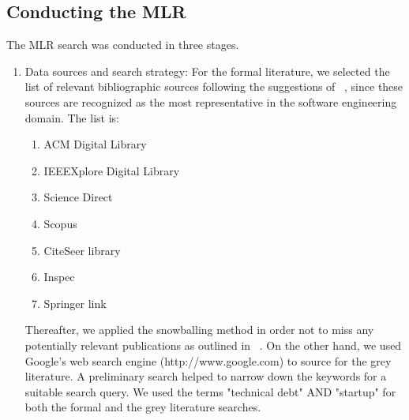 \documentclass[manuscript]{acmart}
\begin{document}
\subsection{Conducting the MLR}
The MLR search was conducted in three stages.
\begin{enumerate}
\item Data sources and search strategy: For the formal literature, we selected the list of relevant bibliographic sources following the suggestions of ~\cite{kitchenham2007guidelines}, since these sources are
recognized as the most representative in the software engineering domain. The list is: 
\begin{enumerate}
   \item ACM Digital Library
\item IEEEXplore Digital Library
\item Science Direct
\item Scopus
\item CiteSeer library
\item Inspec
\item Springer link
\end{enumerate} 

Thereafter, we applied the snowballing method in order not to miss any potentially relevant publications as outlined in ~\cite{Wohlin2014/2601248.2601268}.
On the other hand, we used Google's web search engine (http://www.google.com) to source for the grey literature.
A preliminary search helped to narrow down the keywords for a suitable search query. We used the terms "technical debt" AND "startup" for both the formal and the grey literature searches.


\end{enumerate}
\end{document}
